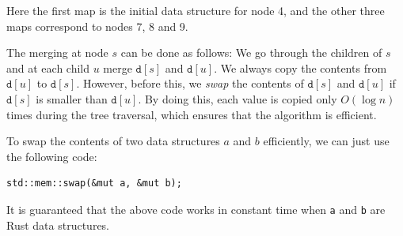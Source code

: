 \begin{center}
\end{center}

Here the first map is the initial data structure
for node 4,
and the other three maps correspond to nodes 7, 8 and 9.

The merging at node $s$ can be done as follows:
We go through the children of $s$
and at each child $u$ merge $\texttt{d}[s]$
and $\texttt{d}[u]$.
We always copy the contents from $\texttt{d}[u]$
to $\texttt{d}[s]$.
However, before this, we \emph{swap}
the contents of $\texttt{d}[s]$ and $\texttt{d}[u]$
if $\texttt{d}[s]$ is smaller than $\texttt{d}[u]$.
By doing this, each value is copied only $O(\log n)$
times during the tree traversal,
which ensures that the algorithm is efficient.

To swap the contents of two data structures $a$ and $b$
efficiently, we can just use the following code:
\begin{lstlisting}
std::mem::swap(&mut a, &mut b);
\end{lstlisting}
It is guaranteed that the above code works in constant time
when \texttt{a} and \texttt{b} are Rust data structures.

